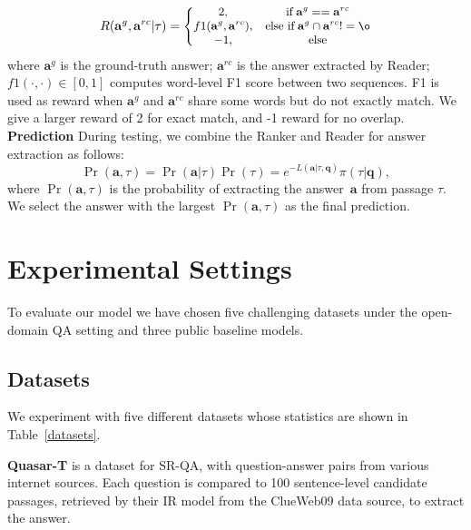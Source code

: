 \documentclass[letterpaper]{article} \usepackage{aaai18}  \usepackage{times}  \usepackage{helvet}  \usepackage{courier}  \usepackage{url}  \usepackage{graphicx}  \usepackage{comment}
\begin{document}
\begin{equation}
\small
R(\mathbf{a}^g,\mathbf{a}^{rc}| \tau) =\left\{\begin{matrix}
2, & \text{if} \; \mathbf{a}^g == \mathbf{a}^{rc}\\ 
f1(\mathbf{a}^{g},\mathbf{a}^{rc}), & \text{else if}\; \mathbf{a}^{g} \cap \mathbf{a}^{rc} !=\o  \\ 
-1, & \text{else}
\end{matrix}\right.
\end{equation}
where $\mathbf{a}^g$ is the ground-truth answer; $\mathbf{a}^{rc}$ is the answer extracted by Reader; $f1(\cdot ,\cdot )\in [0,1]$ computes
word-level F1 score between two sequences. F1 is used as reward when $\mathbf{a}^g$ and $\mathbf{a}^{rc}$ share some words but do not exactly match. We give a larger reward of 2 for exact match, and -1 reward for no overlap. \\

\noindent\textbf{Prediction} \quad
During testing, we combine the Ranker and Reader for answer extraction as follows: 
\begin{equation}
\Pr(\mathbf{a},\tau) = \Pr(\mathbf{a}|\tau)\Pr(\tau) =
e^{-L(\mathbf{a}|\tau,\mathbf{q}) } \pi(\tau|\mathbf{q}),
\label{eqn:pred_prob}
\end{equation}
where $\Pr(\mathbf{a},\tau)$ is the probability of extracting the answer~$\textbf{a}$ from passage $\tau$. We select the answer with the largest $\Pr(\mathbf{a},\tau)$ as the final prediction. 



\section{Experimental Settings}
To evaluate our model we have chosen five challenging datasets under the open-domain QA setting  and three public baseline models.

\subsection{Datasets}
We experiment with five different datasets whose statistics are shown in Table~\ref{datasets}.


\textbf{Quasar-T} is a dataset for
SR-QA, with
question-answer pairs from various internet sources. Each question is compared to 100 sentence-level candidate passages, retrieved by their IR model from the ClueWeb09 data source, to extract the answer. 
\end{document}
